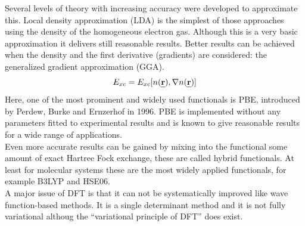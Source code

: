 \documentclass[11pt,DIV=13,BCOR=5mm,a4paper,headinclude]{scrbook}
\def\mathbi#1{\textbf{\em #1}}
\renewcommand{\vec}[1]{\mathbi{#1}}
\begin{document}
Several levels of theory with increasing accuracy were developed to approximate this.
Local density approximation (LDA) is the simplest of those approaches using the density of the homogeneous electron gas.
Although this is a very basic approximation it delivers still reasonable results.
Better results can be achieved when the density and the first derivative (gradients) are considered: the generalized gradient approximation (GGA).
\begin{equation}
  E_{xc}=E_{xc}[n(\vec{r}),\nabla n(\vec{r})]
\end{equation}
Here, one of the most prominent and widely used functionals is PBE, introduced by Perdew, Burke and Ernzerhof in 1996\cite{Perdew96a,erratum}.
PBE is implemented without any parameters fitted to experimental results and is known to give reasonable results for a wide range of applications.
\\
Even more accurate results can be gained by mixing into the functional some amount of exact Hartree Fock exchange, these are called hybrid functionals.
At least for molecular systems these are the most widely applied functionals, for example B3LYP\cite{B3LYP1,B3LYP2} and HSE06.
\\
A major issue of DFT is that it can not be systematically improved like wave function-based methods.
It is a single determinant method and it is not fully variational althoug the ``variational principle of DFT'' does exist.
\end{document}
